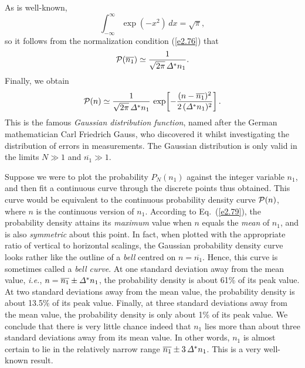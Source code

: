 As is well-known,
\begin{equation}
\int_{-\infty}^{\infty}
\exp(-x^2)\,dx = \sqrt{\pi},\label{e2.79a}
\end{equation}
so it  follows from the normalization condition (\ref{e2.76}) that
\begin{equation}
{\cal P}(\overline{n_1})\simeq \frac{1}{
 \sqrt{2\pi} \,{\mit\Delta}^\ast n_1}.
\end{equation}
Finally, we obtain
\begin{equation}\label{e2.79}
{\cal P}(n) \simeq \frac{1}{\sqrt{2\pi} \,{\mit\Delta}^\ast n_1}\,
\exp\!\left[-\frac{(n-\overline{n_1})^2}{2\,({\mit\Delta}^\ast n_1)^2}\right].
\end{equation}
This is the famous {\em Gaussian distribution function}, named after the
German mathematician Carl Friedrich  Gauss, who discovered it whilst 
investigating the distribution of errors in measurements. The Gaussian
distribution is only valid in the limits $N\gg 1$ and $\overline{n_1}\gg 1$.

Suppose we were to 
plot the probability $P_N(n_1)$ 
 against the integer variable $n_1$, and then
fit a continuous curve through the discrete points thus obtained. This curve
would be 
equivalent to the continuous probability density curve ${\cal P}(n)$, where
$n$ is the continuous version of $n_1$. According to Eq.~(\ref{e2.79}), the
probability density attains its  {\em maximum}\/ 
value when $n$ equals the {\em mean}\/ 
 of $n_1$, and
is also {\em symmetric}\/  about this point. In fact, when plotted with the
appropriate ratio of vertical to horizontal scalings, the Gaussian probability
density curve looks rather like the outline of a
 {\em bell}\/ centred on $n= \overline{n_1}$. Hence, this curve is sometimes
called a {\em bell curve}.
At one standard deviation away from the mean value, {\em i.e.},
$n=\overline{n_1}\pm {\mit\Delta}^\ast n_1$, the probability density is
 about 61\% of its peak value. At two standard deviations away from the mean
value, the probability density is about 13.5\% of its peak value.
Finally, 
at three standard deviations away from the mean value, the probability
density is only about 1\% of its peak value. We conclude
 that there is
very little chance indeed that $n_1$ lies more than about three standard deviations
away from its mean value. In other words, $n_1$ is almost certain to lie in the
relatively narrow range
$\overline{n_1}\pm 3\,{\mit\Delta}^\ast n_1$. This is a very well-known result.


